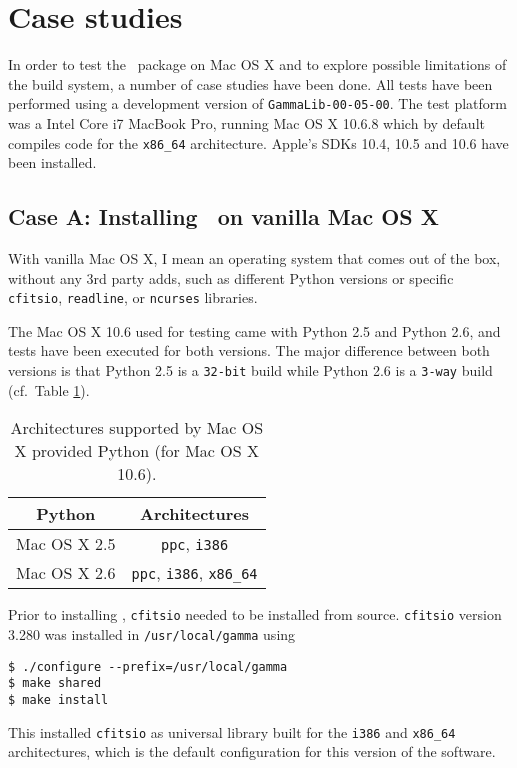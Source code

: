 \documentclass{article}[12pt,a4]
\begin{document}
\section{Case studies}

In order to test the \this\ package on Mac OS X and to explore possible limitations of the build
system, a number of case studies have been done.
All tests have been performed using a development version of {\tt GammaLib-00-05-00}.
The test platform was a Intel Core i7 MacBook Pro, running Mac OS X 10.6.8
which by default compiles code for the {\tt x86\_64} architecture. 
Apple's SDKs 10.4, 10.5 and 10.6 have been installed.


\subsection{Case A: Installing \this\ on vanilla Mac OS X}
\label{sec:vanilla}

With vanilla Mac OS X, I mean an operating system that comes out of the box, without any
3rd party adds, such as different Python versions or specific {\tt cfitsio}, {\tt readline}, or
{\tt ncurses} libraries.

The Mac OS X 10.6 used for testing came with Python 2.5 and Python 2.6, and tests have been executed
for both versions.
The major difference between both versions is that Python 2.5 is a {\tt 32-bit} build while
Python 2.6 is a {\tt 3-way} build (cf.~Table \ref{table:macpython}).

\begin{table}[!h]
  \center
  \begin{tabular}{cc}
  \hline
  Python & Architectures \\
  \hline
  Mac OS X 2.5 & {\tt ppc}, {\tt i386} \\
  Mac OS X 2.6 & {\tt ppc}, {\tt i386}, {\tt x86\_64} \\
  \hline
  \end{tabular}
  \caption{Architectures supported by Mac OS X provided Python (for Mac OS X 10.6).}
  \label{table:macpython}
\end{table}

Prior to installing \this, {\tt cfitsio} needed to be installed from source.
{\tt cfitsio} version 3.280 was installed in {\tt /usr/local/gamma} using 
{\small\begin{verbatim}
$ ./configure --prefix=/usr/local/gamma
$ make shared
$ make install
\end{verbatim}}
This installed {\tt cfitsio} as universal library built for the {\tt i386} and {\tt x86\_64} architectures,
which is the default configuration for this version of the software.
\end{document}
